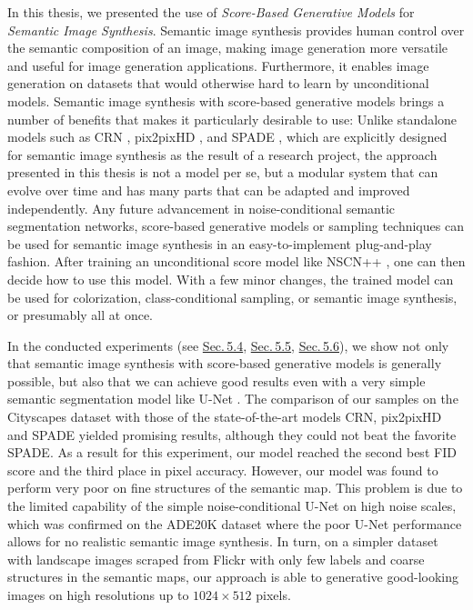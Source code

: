 In this thesis, we presented the use of \textit{Score-Based Generative Models} \cite{score_1, score_2, score_3} for \textit{Semantic Image Synthesis}. Semantic image synthesis provides human control over the semantic composition of an image, making image generation more versatile and useful for image generation applications. Furthermore, it enables image generation on datasets that would otherwise hard to learn by unconditional models. Semantic image synthesis with score-based generative models brings a number of benefits that makes it particularly desirable to use: Unlike standalone models such as CRN \cite{crn}, pix2pixHD \cite{pix2pixHD}, and SPADE \cite{spade}, which are explicitly designed for semantic image synthesis as the result of a research project, the approach presented in this thesis is not a model per se, but a modular system that can evolve over time and has many parts that can be adapted and improved independently. Any future advancement in noise-conditional semantic segmentation networks, score-based generative models or sampling techniques can be used for semantic image synthesis in an easy-to-implement plug-and-play fashion. After training an unconditional score model like NSCN++ \cite{score_3}, one can then decide how to use this model. With a few minor changes, the trained model can be used for colorization, class-conditional sampling, or semantic image synthesis, or presumably all at once.

In the conducted experiments (see \hyperref[sec:5.4]{Sec.\,5.4}, \hyperref[sec:5.5]{Sec.\,5.5}, \hyperref[sec:5.6]{Sec.\,5.6}), we show not only that semantic image synthesis with score-based generative models is generally possible, but also that we can achieve good results even with a very simple semantic segmentation model like U-Net \cite{unet}. The comparison of our samples on the Cityscapes dataset \cite{cityscapes} with those of the state-of-the-art models CRN, pix2pixHD and SPADE yielded promising results, although they could not beat the favorite SPADE. As a result for this experiment, our model reached the second best FID score \cite{fid} and the third place in pixel accuracy. However, our model was found to perform very poor on fine structures of the semantic map. This problem is due to the limited capability of the simple noise-conditional U-Net on high noise scales, which was confirmed on the ADE20K \cite{ade20k} dataset where the poor U-Net performance allows for no realistic semantic image synthesis. In turn, on a simpler dataset with landscape images scraped from Flickr with only few labels and coarse structures in the semantic maps, our approach is able to generative good-looking images on high resolutions up to $1024\times512$ pixels.


